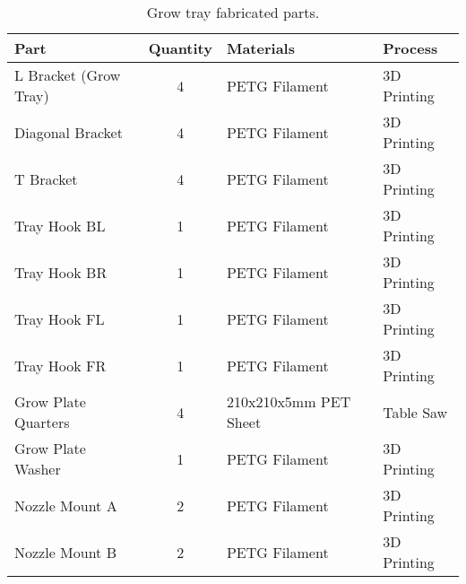 \begin{table}[!ht]
    \centering
    \begin{tabular}{|l|c|l|l|}
    \hline
        Part                    & Quantity  & Materials             & Process           \\ \hline
        L Bracket (Grow Tray)   & 4         & PETG Filament         & 3D Printing       \\ \hline
        Diagonal Bracket        & 4         & PETG Filament         & 3D Printing       \\ \hline
        T Bracket               & 4         & PETG Filament         & 3D Printing       \\ \hline
        Tray Hook BL            & 1         & PETG Filament         & 3D Printing       \\ \hline
        Tray Hook BR            & 1         & PETG Filament         & 3D Printing       \\ \hline
        Tray Hook FL            & 1         & PETG Filament         & 3D Printing       \\ \hline
        Tray Hook FR            & 1         & PETG Filament         & 3D Printing       \\ \hline
        Grow Plate Quarters     & 4         & 210x210x5mm PET Sheet & Table Saw         \\ \hline
        Grow Plate Washer       & 1         & PETG Filament         & 3D Printing       \\ \hline
        Nozzle Mount A          & 2         & PETG Filament         & 3D Printing       \\ \hline
        Nozzle Mount B          & 2         & PETG Filament         & 3D Printing       \\ \hline
    \end{tabular}
    \caption{Grow tray fabricated parts.}
    \label{tab:housing_growtray_fabrication}
\end{table}

\clearpage

